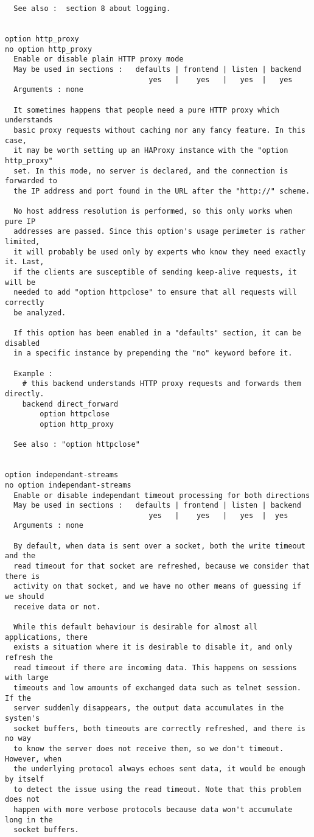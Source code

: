 \begin{verbatim}
  See also :  section 8 about logging.


option http_proxy
no option http_proxy
  Enable or disable plain HTTP proxy mode
  May be used in sections :   defaults | frontend | listen | backend
                                 yes   |    yes   |   yes  |   yes
  Arguments : none

  It sometimes happens that people need a pure HTTP proxy which understands
  basic proxy requests without caching nor any fancy feature. In this case,
  it may be worth setting up an HAProxy instance with the "option http_proxy"
  set. In this mode, no server is declared, and the connection is forwarded to
  the IP address and port found in the URL after the "http://" scheme.

  No host address resolution is performed, so this only works when pure IP
  addresses are passed. Since this option's usage perimeter is rather limited,
  it will probably be used only by experts who know they need exactly it. Last,
  if the clients are susceptible of sending keep-alive requests, it will be
  needed to add "option httpclose" to ensure that all requests will correctly
  be analyzed.

  If this option has been enabled in a "defaults" section, it can be disabled
  in a specific instance by prepending the "no" keyword before it.

  Example :
    # this backend understands HTTP proxy requests and forwards them directly.
    backend direct_forward
        option httpclose
        option http_proxy

  See also : "option httpclose"


option independant-streams
no option independant-streams
  Enable or disable independant timeout processing for both directions
  May be used in sections :   defaults | frontend | listen | backend
                                 yes   |    yes   |   yes  |  yes
  Arguments : none

  By default, when data is sent over a socket, both the write timeout and the
  read timeout for that socket are refreshed, because we consider that there is
  activity on that socket, and we have no other means of guessing if we should
  receive data or not.

  While this default behaviour is desirable for almost all applications, there
  exists a situation where it is desirable to disable it, and only refresh the
  read timeout if there are incoming data. This happens on sessions with large
  timeouts and low amounts of exchanged data such as telnet session. If the
  server suddenly disappears, the output data accumulates in the system's
  socket buffers, both timeouts are correctly refreshed, and there is no way
  to know the server does not receive them, so we don't timeout. However, when
  the underlying protocol always echoes sent data, it would be enough by itself
  to detect the issue using the read timeout. Note that this problem does not
  happen with more verbose protocols because data won't accumulate long in the
  socket buffers.


\end{verbatim}
